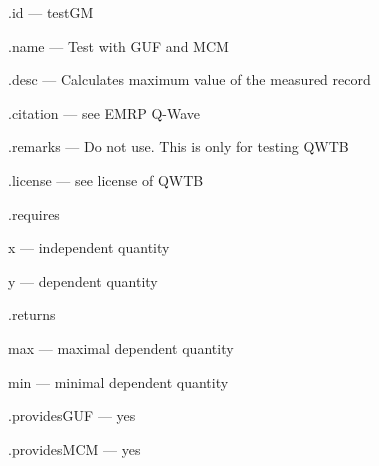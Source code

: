 \begin{tightdesc}
\item [\textsf{.id}] --- testGM
\item [\textsf{.name}] --- Test with GUF and MCM
\item [\textsf{.desc}] --- Calculates maximum value of the measured record
\item [\textsf{.citation}] --- see EMRP Q-Wave
\item [\textsf{.remarks}] --- Do not use. This is only for testing QWTB
\item [\textsf{.license}] --- see license of QWTB
\item [\textsf{.requires}] \rule{0em}{0em}
\begin{tightdesc}
\item [\textsf{x}] --- independent quantity
\item [\textsf{y}] --- dependent quantity
\end{tightdesc}
\item [\textsf{.returns}] \rule{0em}{0em}
\begin{tightdesc}
\item [\textsf{max}] --- maximal dependent quantity
\item [\textsf{min}] --- minimal dependent quantity
\end{tightdesc}
\item [\textsf{.providesGUF}] --- yes
\item [\textsf{.providesMCM}] ---  yes
\end{tightdesc}
